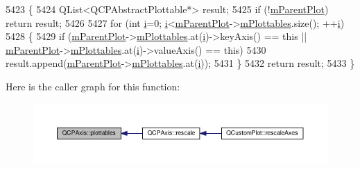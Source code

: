 \begin{DoxyCode}
5423 \{
5424   QList<QCPAbstractPlottable*> result;
5425   \textcolor{keywordflow}{if} (!\hyperlink{class_q_c_p_layerable_aa2a528433e44db02b8aef23c1f9f90ed}{mParentPlot}) \textcolor{keywordflow}{return} result;
5426   
5427   \textcolor{keywordflow}{for} (\textcolor{keywordtype}{int} \hyperlink{_comparision_pictures_2_createtest_image_8m_a6f6ccfcf58b31cb6412107d9d5281426}{i}=0; \hyperlink{_comparision_pictures_2_createtest_image_8m_a6f6ccfcf58b31cb6412107d9d5281426}{i}<\hyperlink{class_q_c_p_layerable_aa2a528433e44db02b8aef23c1f9f90ed}{mParentPlot}->\hyperlink{class_q_custom_plot_a62bf8e4e7f8d23fc1e9301ba0148269f}{mPlottables}.size(); ++\hyperlink{_comparision_pictures_2_createtest_image_8m_a6f6ccfcf58b31cb6412107d9d5281426}{i})
5428   \{
5429     \textcolor{keywordflow}{if} (\hyperlink{class_q_c_p_layerable_aa2a528433e44db02b8aef23c1f9f90ed}{mParentPlot}->\hyperlink{class_q_custom_plot_a62bf8e4e7f8d23fc1e9301ba0148269f}{mPlottables}.at(\hyperlink{_comparision_pictures_2_createtest_image_8m_a6f6ccfcf58b31cb6412107d9d5281426}{i})->keyAxis() == \textcolor{keyword}{this} ||
      \hyperlink{class_q_c_p_layerable_aa2a528433e44db02b8aef23c1f9f90ed}{mParentPlot}->\hyperlink{class_q_custom_plot_a62bf8e4e7f8d23fc1e9301ba0148269f}{mPlottables}.at(\hyperlink{_comparision_pictures_2_createtest_image_8m_a6f6ccfcf58b31cb6412107d9d5281426}{i})->valueAxis() == \textcolor{keyword}{this})
5430       result.append(\hyperlink{class_q_c_p_layerable_aa2a528433e44db02b8aef23c1f9f90ed}{mParentPlot}->\hyperlink{class_q_custom_plot_a62bf8e4e7f8d23fc1e9301ba0148269f}{mPlottables}.at(\hyperlink{_comparision_pictures_2_createtest_image_8m_a6f6ccfcf58b31cb6412107d9d5281426}{i}));
5431   \}
5432   \textcolor{keywordflow}{return} result;
5433 \}
\end{DoxyCode}


Here is the caller graph for this function\+:\nopagebreak
\begin{figure}[H]
\begin{center}
\leavevmode
\includegraphics[width=350pt]{class_q_c_p_axis_a4f7404494cccdbfc00e1e865b7ed16a4_icgraph}
\end{center}
\end{figure}


